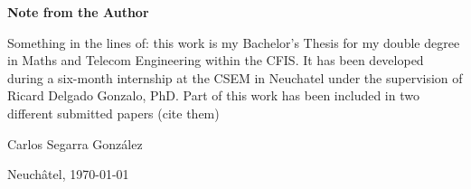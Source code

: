 \vspace*{4cm}
\Huge
\textbf{Note from the Author} \label{sec:acknowledgments}
\normalsize

\vspace{1cm}

Something in the lines of: this work is my Bachelor's Thesis for my double degree in Maths and Telecom Engineering within the CFIS. It has been developed during a six-month internship at the CSEM in Neuchatel under the supervision of Ricard Delgado Gonzalo, PhD. Part of this work has been included in two different submitted papers (cite them)  

\vspace{1cm}

\begin{flushright}
Carlos Segarra Gonz\'alez

Neuch\^atel, \today
\end{flushright}

\vspace*{\fill}
